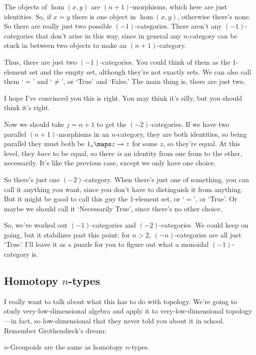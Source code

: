 \documentclass{amsart}
\begin{document}
The objects of $\hom(x,y)$ are $(n+1)$-morphisms, which here are just
identities.  So, if $x=y$ there is one object in $\hom(x,y)$,
otherwise there's none.  So there are really just two possible
$(-1)$-categories.  There aren't any $(-1)$-categories that don't
arise in this way, since in general any $n$-category can be stuck 
in between two objects to make an $(n+1)$-category.

Thus, there are just two $(-1)$-categories.  You could think of them as
the 1-element set and the empty set, although they're not exactly
sets.  We can also call them `$=$' and `$\neq$', or `True' and
`False.'  The main thing is, there are just two.

I hope I've convinced you this is right.  You may think it's silly,
but you should think it's right.

Now we should take $j= n+1$ to get the $(-2)$-categories.  If we have
two parallel $(n+1)$-morphisms in an $n$-category, they are both
identities, so being parallel they must both be 
$1_z \maps z\to z$ for some $z$, so they're equal.
At this level, they \emph{have} to be equal, so there \emph{is} an
identity from one from to the other, necessarily.  It's
like the previous case, except we only have one choice.

So there's just one $(-2)$-category.  When there's just one of
something, you can call it anything you want, since you don't have to
distinguish it from anything.  But it might be good to call 
this guy the 1-element set, or `$=$', or `True'.  Or maybe we should
call it `Necessarily True', since there's no other choice.

So, we've worked out $(-1)$-categories and $(-2)$-categories.  
We could keep on going, but it stabilizes past this point:
for $n>2$, $(-n)$-categories are all just `True.'
I'll leave it as a puzzle for you to figure out what a monoidal
$(-1)$-category is.

\subsection{Homotopy $n$-types}
\label{sec:homotopy-n-types}

I really want to talk about what this has to do with topology.  We're
going to study very-low-dimensional algebra and apply it to
very-low-dimensional topology---in fact, so low-dimensional that they
never told you about it in school.  Remember Grothendieck's dream:

\begin{hyp}
$n$-Groupoids are the same as homotopy $n$-types.
\end{hyp}
\end{document}
